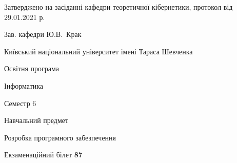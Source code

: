 \documentclass[10pt, ukrainian]{article}
\begin{document}
{\vspace{5mm}\smallskip \begin {small} Затверджено на засіданні кафедри теоретичної кібернетики, протокол  від   29.01.2021 р.\par\smallskip\smallskip
{\parbox {6.5 cm}{Зав. кафедри \dotfill Ю.В.~Крак}} \end{small}}
\newpage

{{\begin {small}\par
{ \center  Київський національний університет імені Тараса Шевченка \par}
{\parbox {5 cm}{Освітня програма \hfill}{\parbox {7 cm}{Інформатика \hfill}}\parbox {6 cm}{\hfill Семестр 6}}\par
{\parbox {5 cm} {Навчальний предмет \hfill}\parbox {7 cm}{Розробка програмного забезпечення \hfill}\parbox {6cm}{\hfill}\par}\vspace{-7pt} \end{small}}{\center Екзаменаційний білет \No \textbf
{ 87 }\par}}
\end{document}
